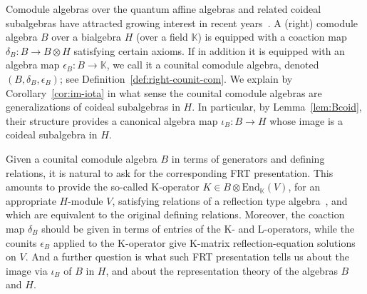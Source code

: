 \documentclass[11pt]{amsart}
\numberwithin{equation}{section}
\numberwithin{equation}{section}
\begin{document}
Comodule algebras over the quantum affine algebras and related coideal subalgebras have attracted growing interest in recent years~\cite{MRS02,BB09,Ko12,LBG,Lu23,AV24,LP26}. A (right) comodule algebra $B$ over a bialgebra $H$ (over a field $\mathbb K$) is equipped with a coaction map $\delta_B: B \rightarrow B \otimes H$ satisfying certain axioms. If in addition it is equipped with an algebra map $\epsilon_B: B \rightarrow {\mathbb K}$, we call it a counital comodule algebra, denoted $(B,\delta_B,\epsilon_B)$; see Definition~\ref{def:right-counit-com}. We explain by Corollary~\ref{cor:im-iota}  in what sense the counital comodule algebras are generalizations of coideal subalgebras in $H$. In particular, by Lemma~\ref{lem:Bcoid}, their structure provides a canonical algebra map $\iota_B\colon B\rightarrow H$ whose image is a coideal subalgebra in $H$.

Given a counital comodule algebra $B$ in terms of generators and defining relations, it is natural to ask for the corresponding FRT presentation. This amounts to provide the so-called K-operator $K\in  B \otimes \mathrm{End}_{\mathbb{K}}(V)$, for an appropriate $H$-module $V$, satisfying relations of a reflection type algebra~\cite{Skly88}, and which are equivalent to the original defining relations.
Moreover, the coaction map $\delta_B$ should be given in terms of entries of the K- and L-operators, while the counits $\epsilon_B$ applied to the K-operator give K-matrix reflection-equation solutions on $V$. And a further question is what such FRT presentation tells us about  the image via $\iota_B$ of $B$ in $H$, and about the representation theory of the algebras $B$ and $H$.
\end{document}
